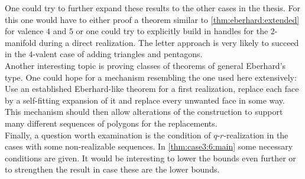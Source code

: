 One could try to further expand these results to the other cases in the thesis. For this one would have to either proof a theorem similar to \autoref{thm:eberhard:extended} for valence $4$ and $5$ or one could try to explicitly build in handles for the $2$-manifold during a direct realization. The letter approach is very likely to succeed in the $4$-valent case of adding triangles and pentagons.\\
Another interesting topic is proving classes of theorems of general Eberhard's type. One could hope for a mechanism resembling the one used here extensively: Use an established Eberhard-like theorem for a first realization, replace each face by a self-fitting expansion of it and replace every unwanted face in some way. This mechanism should then allow alterations of the construction to support many different sequences of polygons for the replacements. \\
Finally, a question worth examination is the condition of $q$-$r$-realization in the cases with some non-realizable sequences. In \autoref{thm:case3:6:main} some necessary conditions are given. It would be interesting to lower the bounds even further or to strengthen the result in case these are the lower bounds.